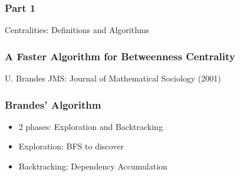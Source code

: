
\begin{frame}
  \frametitle{Part 1}
  \centering
  \Huge Centralities: Definitions and Algorithms
\end{frame}


\begin{frame}
  \frametitle{A Faster Algorithm for Betweenness Centrality}
  \centering
  \vfill
  {\huge U. Brandes}
  \vfill
  {\large JMS: Journal of Mathematical Sociology (2001)}
\end{frame}

\begin{frame}
  \frametitle{Brandes' Algorithm}

  \begin{itemize}
    \item 2 phases: Exploration and Backtracking
    \item Exploration: BFS to discover \allspath
    \item Backtracking: Dependency Accumulation
  \end{itemize}
\end{frame}